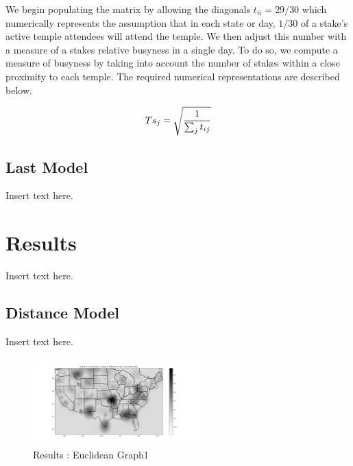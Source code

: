 \documentclass[twoside,twocolumn]{article}
\begin{document}
We begin populating the matrix by allowing the diagonals $t_{ii} = 29/30$ which numerically represents the assumption that in each state or day, $1/30$ of a stake's active temple attendees will attend the temple.
We then adjust this number with a measure of a stakes relative busyness in a single day.
To do so, we compute a measure of busyness by taking into account the number of stakes within a close proximity to each temple.
The required numerical representations are described below.

\begin{equation}
\begin{aligned}
Ts_j = \sqrt{1\over{\sum_j{t_{ij}}}}
\end{aligned}
\end{equation}


\subsection{Last Model} %
Insert text here.
\section{Results}
\label{sec:res}
Insert text here.

\subsection{Distance Model}
Insert text here.
\begin{figure}[h!] %
\centering %
\includegraphics[width=0.6\textwidth]{Euclidean_Graph1} %
\caption{Results : Euclidean Graph1} %
\label{fig:Results1}
\end{figure}
\end{document}
